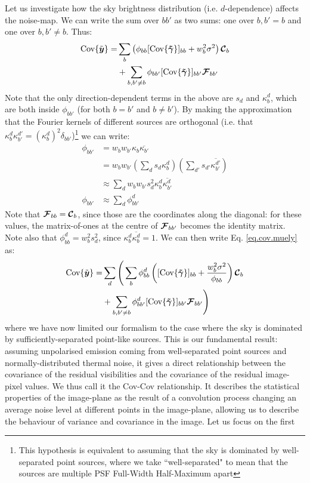 Let us investigate how the sky brightness distribution (i.e. $d$-dependence) affects the noise-map. We can write the sum over $bb'$ as two sums: one over $b,b'=b$ and one over $b,b'\ne b$. Thus:
\begin{align}
\textrm{Cov}\{\tilde{\bm{{{y}}}}\} =& \sum_b \left(\phi_{bb}  [\textrm{Cov}\{\bm{\tilde{\gamma}}\}]_{bb} + w_b^2 \sigma^2 \right) \bm{\mathcal{C}}_b\nonumber\\
              &+ \sum_{b,b'\ne b} \phi_{bb'} [\textrm{Cov}\{\bm{\tilde{\gamma}}\}]_{bb'} \bm{\mathcal{F}}_{bb'} \label{eq.cov.muely}
\end{align}
Note that the only direction-dependent terms in the above are $s_d$ and $\kappa_b^d$, which are both inside $\phi_{bb'}$ (for both $b=b'$ and $b \ne b'$). {By making the approximation that the Fourier kernels of different sources are orthogonal (i.e. that $\kappa_b^d \kappa_{b'}^{d'} = (\kappa_b^d)^2 \delta_{bb'}$)}\footnote{{This hypothesis is equivalent to assuming that the sky is dominated by well-separated point sources, where we take ``well-separated" to mean that the sources are multiple PSF Full-Width Half-Maximum apart}} we can write:
\begin{align}
\phi_{bb'} &= w_b w_{b'} \kappa_b \overline{\kappa_{b'}}\\
           &= w_b w_{b'} \left(\sum_d s_d \kappa_b^d\right)\left(\sum_{d'} s_{d'} \overline{\kappa_{b'}^{d'}}\right)\label{eq.dudv.intro}\\
           &\approx \sum_d w_b w_{b'} s_d^2 \kappa_b^d \overline{\kappa_{b'}^d}\label{whocares}\\
\phi_{bb'} &\approx \sum_d \phi_{bb'}^d
\end{align}
{Note that $\bm{\mathcal{F}}_{bb}=\bm{\mathcal{C}}_b$, since those are the coordinates along the diagonal: for these values, the matrix-of-ones at the centre of $\bm{\mathcal{F}}_{bb'}$ becomes the identity matrix. Note also} that $\phi_{bb}^d = w_b^2 s_d^2$, since $\kappa_b^d \overline{\kappa_{b}^d}=1$. We can then write Eq. \ref{eq.cov.muely} as:
\begin{align}
\textrm{Cov}\{\tilde{\bm{{{y}}}}\} =& \sum_d \Bigg(\sum_b \phi_{bb}^d \left( [\textrm{Cov}\{\bm{\tilde{\gamma}}\}]_{bb} + \frac{w_b^2 \sigma^2}{\phi_{bb}} \right) \bm{\mathcal{C}}_b\nonumber\\
              &+ \sum_{b,b'\ne b}  \phi_{bb'}^d [\textrm{Cov}\{\bm{\tilde{\gamma}}\}]_{bb'} \bm{\mathcal{F}}_{bb'} \Bigg)\label{eq.covcov.matrix}
\end{align}
{where we have now limited our formalism to the case where the sky is dominated by sufficiently-separated point-like sources.}
\pg
This is our fundamental result: {assuming unpolarised emission coming from well-separated point sources and normally-distributed thermal noise}, it gives a direct relationship between the covariance of the residual visibilities and the covariance of the residual image-pixel values. We thus call it the Cov-Cov relationship. It describes the statistical properties of the image-plane as the result of a convolution process {changing an average noise level at different points in the image-plane, allowing} us to describe the behaviour of variance and covariance in the image. Let us focus on the first
